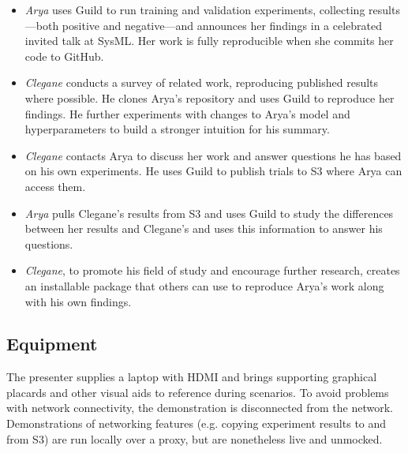 \documentclass{article}
\begin{document}
\begin{itemize}[topsep=0pt, itemsep=0pt]
\item \emph{Arya} uses Guild to run training and validation
  experiments, collecting results---both positive and negative---and
  announces her findings in a celebrated invited talk at SysML. Her
  work is fully reproducible when she commits her code to GitHub.

\item \emph{Clegane} conducts a survey of related work, reproducing
  published results where possible. He clones Arya's repository and
  uses Guild to reproduce her findings. He further experiments with
  changes to Arya's model and hyperparameters to build a stronger
  intuition for his summary.

\item \emph{Clegane} contacts Arya to discuss her work and answer
  questions he has based on his own experiments. He uses Guild to
  publish trials to S3 where Arya can access them.

\item \emph{Arya} pulls Clegane's results from S3 and uses Guild to
  study the differences between her results and Clegane's and uses
  this information to answer his questions.

\item \emph{Clegane}, to promote his field of study and encourage
  further research, creates an installable package that others can use
  to reproduce Arya's work along with his own findings.
\end{itemize}

\subsection{Equipment}

The presenter supplies a laptop with HDMI and brings supporting
graphical placards and other visual aids to reference during
scenarios. To avoid problems with network connectivity, the
demonstration is disconnected from the network. Demonstrations of
networking features (e.g. copying experiment results to and from S3)
are run locally over a proxy, but are nonetheless live and unmocked.



\end{document}
